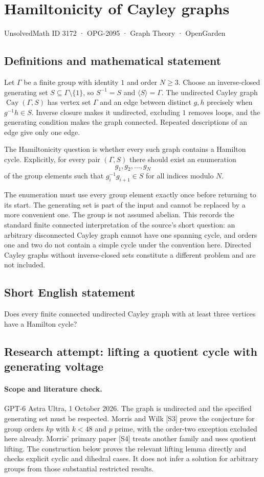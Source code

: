 \documentclass[11pt,a4paper]{article}
\begin{document}
\section*{Hamiltonicity of Cayley graphs}\label{3172}
{\small UnsolvedMath ID 3172 · OPG-2095 · Graph Theory · OpenGarden}
\subsection{Definitions and mathematical statement}
Let $\Gamma$ be a finite group with identity $1$ and order
$N\geq3$. Choose an inverse-closed generating set
$S\subseteq\Gamma\setminus\{1\}$, so $S^{-1}=S$ and
$\langle S\rangle=\Gamma$. The undirected Cayley graph
$\operatorname{Cay}(\Gamma,S)$ has vertex set $\Gamma$ and
an edge between distinct $g,h$ precisely when
$g^{-1}h\in S$. Inverse closure makes it undirected,
excluding $1$ removes loops, and the generating condition
makes the graph connected. Repeated descriptions of an edge
give only one edge.

The Hamiltonicity question is whether every such graph
contains a Hamilton cycle. Explicitly, for every pair
$(\Gamma,S)$ there should exist an enumeration
\[
 g_1,g_2,\ldots,g_N
\]
of the group elements such that $g_i^{-1}g_{i+1}\in S$
for all indices modulo $N$.

The enumeration must use every group element exactly once
before returning to its start. The generating set is part
of the input and cannot be replaced by a more convenient
one. The group is not assumed abelian. This records the
standard finite connected interpretation of the source's
short question: an arbitrary disconnected Cayley graph
cannot have one spanning cycle, and orders one and two
do not contain a simple cycle under the convention here.
Directed Cayley graphs without inverse-closed sets constitute
a different problem and are not included.
\subsection{Short English statement}
Does every finite connected undirected Cayley graph with at least three vertices have a Hamilton cycle?
\subsection{Research attempt: lifting a quotient cycle with generating voltage}
\paragraph{Scope and literature check.}
GPT-6 Astra Ultra, 1 October 2026. The graph is undirected and the
specified generating set must be respected. Morris and Wilk [S3]
prove the conjecture for group orders $kp$ with $k<48$ and $p$
prime, with the order-two exception excluded here already. Morris'
primary paper [S4] treats another family and uses quotient lifting.
The construction below proves the relevant lifting lemma directly and
checks explicit cyclic and dihedral cases. It does not infer a
solution for arbitrary groups from those substantial restricted results.
\end{document}
